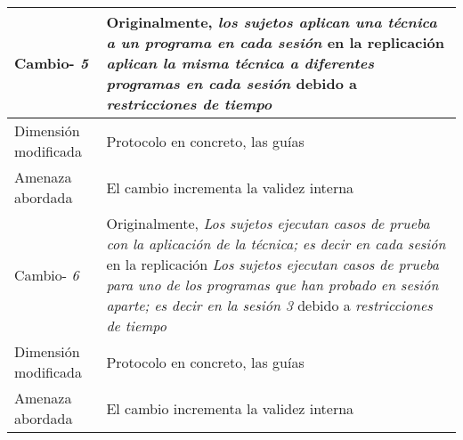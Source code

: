 
\begin{table}
\begin{tabular}{| p{3.3cm} | p{9cm} |}
\hline
 
 Cambio- \textit{5}   & \parbox[t]{9cm} {Originalmente,  \textit{los sujetos aplican una técnica a un programa en cada sesión} } \parbox[t]{9cm}{en la replicación \textit{aplican la misma técnica a diferentes programas en cada sesión} }  debido a  \textit{restricciones de tiempo} \\  \hline
Dimensión modificada & 
Protocolo en concreto, las guías \\  \hline 
Amenaza abordada  & El cambio incrementa la validez interna  \\  \hline \hline

 Cambio- \textit{6}   & \parbox[t]{9cm} {Originalmente,  \textit{Los sujetos ejecutan casos de prueba con la aplicación de la técnica; es decir en cada sesión} } \parbox[t]{9cm}{en la replicación \textit{Los sujetos ejecutan casos de prueba para uno de los programas que han probado en sesión aparte; es decir en la sesión 3} }  debido a  \textit{restricciones de tiempo} \\  \hline
Dimensión modificada & 
Protocolo en concreto, las guías \\  \hline 
Amenaza abordada  & El cambio incrementa la validez interna  \\  \hline  


\end{tabular}
\label{tab:plantillaUPV2}
\end{table}





